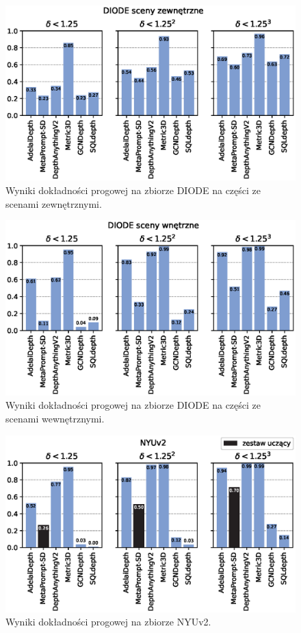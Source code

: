 \begin{figure}[H]
    \centering
    \includegraphics{plots/delta/0}
    \caption{Wyniki dokładności progowej na zbiorze DIODE na części ze scenami zewnętrznymi.}
    \label{fig:delta_0}
\end{figure}
\begin{figure}[H]
    \centering
    \includegraphics{plots/delta/1}
    \caption{Wyniki dokładności progowej na zbiorze DIODE na części ze scenami wewnętrznymi.}
    \label{fig:delta_1}
\end{figure}
\begin{figure}[H]
    \centering
    \includegraphics{plots/delta/2}
    \caption{Wyniki dokładności progowej na zbiorze NYUv2.}
    \label{fig:delta_2}
\end{figure}
